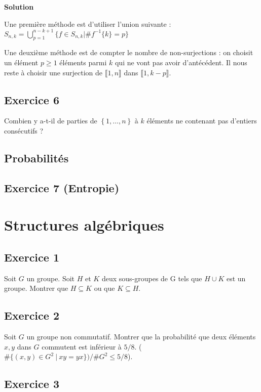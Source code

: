 \documentclass{article}
\newcommand{\n}{\llbracket 1, n \rrbracket}
\begin{document}
\textbf{Solution} 

Une première méthode est d'utiliser l'union suivante : $S_{n, k} = \displaystyle \bigcup_{p=1}^{n-k+1} \{ f \in S_{n, k} | \#f^{-1}\{k\} = p \}$ 

Une deuxième méthode est de compter le nombre de non-surjections : on choisit un élément $p\geqslant 1$ éléments parmi $k$ qui ne vont pas avoir d'antécédent. Il nous reste à choisir une surjection de $\n$ dans $\llbracket 1, k-p \rrbracket$. 

\subsection*{Exercice 6} 

Combien y a-t-il de parties de $\left\{1, \dots, n \right\}$ à $k$ éléments ne contenant pas d'entiers consécutifs ? 

\subsection{Probabilités}

\subsection*{Exercice 7 (Entropie)} 

\clearpage

\section{Structures algébriques} 

\subsection*{Exercice 1} 

Soit $G$ un groupe. Soit $H$ et $K$ deux sous-groupes de G tels que $H\cup K$ est un groupe. Montrer que $H \subseteq K$ ou que $K \subseteq H$. 

\subsection*{Exercice 2} 

Soit $G$ un groupe non commutatif. Montrer que la probabilité que deux éléments $x, y$ dans $G$ commutent est inférieur à $5/8$. ($\#\{(x, y)\in G^2 \ | \ xy = yx\})/\#G^2 \leqslant 5/8$). 

\subsection*{Exercice 3} 
\end{document}
